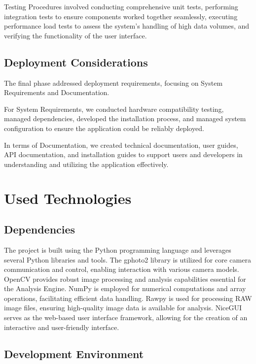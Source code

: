 Testing Procedures involved conducting comprehensive unit tests, performing integration tests to ensure components worked together seamlessly, executing performance load tests to assess the system's handling of high data volumes, and verifying the functionality of the user interface.

\subsection{Deployment Considerations}

The final phase addressed deployment requirements, focusing on System Requirements and Documentation.

For System Requirements, we conducted hardware compatibility testing, managed dependencies, developed the installation process, and managed system configuration to ensure the application could be reliably deployed.

In terms of Documentation, we created technical documentation, user guides, API documentation, and installation guides to support users and developers in understanding and utilizing the application effectively.

\section{Used Technologies}

\subsection{Dependencies}

The project is built using the Python programming language and leverages several Python libraries and tools. The gphoto2 library is utilized for core camera communication and control, enabling interaction with various camera models. OpenCV provides robust image processing and analysis capabilities essential for the Analysis Engine. NumPy is employed for numerical computations and array operations, facilitating efficient data handling. Rawpy is used for processing RAW image files, ensuring high-quality image data is available for analysis. NiceGUI serves as the web-based user interface framework, allowing for the creation of an interactive and user-friendly interface.

\subsection{Development Environment}


